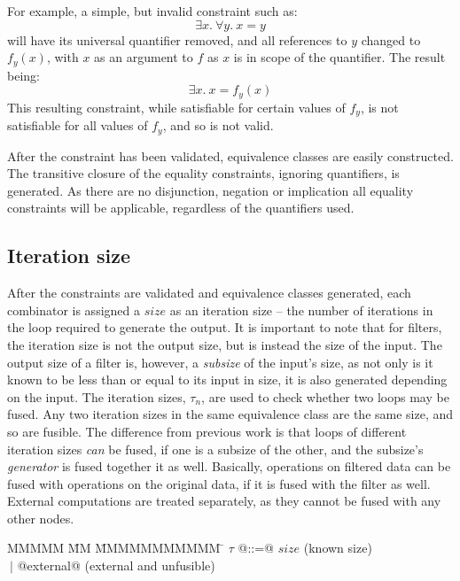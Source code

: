 For example, a simple, but invalid constraint such as:
\[ \exists x.\ \forall y.\ x = y \]
will have its universal quantifier removed, and all references to $y$ changed to $f_y(x)$, with $x$ as an argument to $f$ as $x$ is in scope of the quantifier.
The result being:
\[ \exists x.\ x = f_y(x) \]
This resulting constraint, while satisfiable for certain values of $f_y$, is not satisfiable for all values of $f_y$, and so is not valid.

After the constraint has been validated, equivalence classes are easily constructed.
The transitive closure of the equality constraints, ignoring quantifiers, is generated.
As there are no disjunction, negation or implication all equality constraints will be applicable, regardless of the quantifiers used.


\subsection{Iteration size}
After the constraints are validated and equivalence classes generated, each combinator is assigned a $size$ as an iteration size -- the number of iterations in the loop required to generate the output.
It is important to note that for filters, the iteration size is not the output size, but is instead the size of the input.
The output size of a filter is, however, a \emph{subsize} of the input's size, as not only is it known to be less than or equal to its input in size, it is also generated depending on the input.
The iteration sizes, $\tau_n$, are used to check whether two loops may be fused.
Any two iteration sizes in the same equivalence class are the same size, and so are fusible.
The difference from previous work is that loops of different iteration sizes \emph{can} be fused, if one is a subsize of the other, and the subsize's \emph{generator} is fused together it as well.
Basically, operations on filtered data can be fused with operations on the original data, if it is fused with the filter as well.
External computations are treated separately, as they cannot be fused with any other nodes.

\begin{tabbing}
MMMMM       \= MM \= MMMMMMMMMMM \= \kill
$\tau$       \> @::=@ \> $size$                                  \> (known size) \\
             \> $~|$  \> @external@                              \> (external and unfusible) \\
\end{tabbing}

